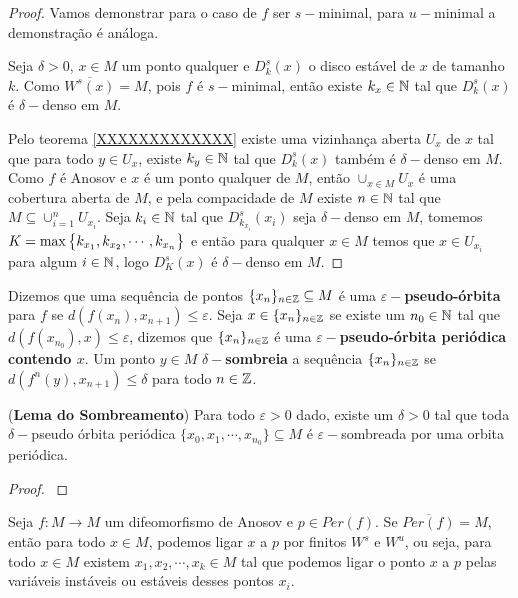 \begin{proof} Vamos demonstrar para o caso de $f$ ser $s-$minimal, para $u-$minimal a demonstração é análoga.

Seja $\delta>0$, $x\in M$ um ponto qualquer e $D_{k}^{s}(x)$ o disco estável de $x$ de tamanho $k$. Como $\overline{W^{s}(x)}=M$, pois $f$ é $s-$minimal, então existe $k_x\in\mathbb{N}$ tal que $D_{k}^{s}(x)$ é $\delta-$denso em $M$. 

Pelo teorema \ref{XXXXXXXXXXXXX} existe uma vizinhança aberta $U_x$ de $x$ tal que para todo $y\in U_x$, existe $k_y\in\mathbb{N}$ tal que $D_{k}^{s}(x)$ também é $\delta-$denso em $M$. Como $f$ é Anosov e $x$ é um ponto qualquer de $M$, então $\cup_{x\in M}{U_x}$ é uma cobertura aberta de $M$, e pela compacidade de $M$ existe $n\in \mathbb{N}$ tal que $M\subseteq \cup_{i=1}^{n}{U_{x_i}}$. Seja $k_i\in \mathbb{N}$ tal que $D_{k_{x_i}}^{s}(x_i)$ seja $\delta-$denso em $M$, tomemos $K=\max\big\{k_{x_1},k_{x_2},\cdots,k_{x_n}\big\}$ e então para qualquer $x\in M$ temos que $x\in U_{x_i}$ para algum $i\in\mathbb{N}$, logo $D_{K}^{s}(x)$ é $\delta-$denso em $M$.
\end{proof}

\begin{definicao} Dizemos que uma sequência de pontos $\{x_n\}_{n\in\mathbb{Z}}\subseteq M$ é uma \textbf{$\varepsilon-$pseudo-órbita} para $f$ se $d(f(x_n),x_{n+1})\leq\varepsilon$. Seja $x\in\{x_n\}_{n\in\mathbb{Z}}$ se existe um $n_0\in\mathbb{N}$ tal que $d(f(x_{n_0}),x)\leq\varepsilon$, dizemos que $\{x_n\}_{n\in\mathbb{Z}}$ é uma \textbf{$\varepsilon-$pseudo-órbita periódica contendo $x$}. Um ponto $y\in M$ \textbf{$\delta-$sombreia} a sequência $\{x_n\}_{n\in\mathbb{Z}}$ se $d(f^n(y),x_{n+1})\leq\delta$ para todo $n\in\mathbb{Z}$.

\end{definicao}

\begin{lema}\label{lemadosombrea} (\textbf{Lema do Sombreamento}) Para todo $\varepsilon>0$ dado, existe um $\delta>0$ tal que toda $\delta-$pseudo órbita periódica $\{x_0,x_1,\cdots,x_{n_0}\}\subseteq M$ é $\varepsilon-$sombreada por uma orbita periódica.
\end{lema}

\begin{proof} \cite{XXXXXXXXXXXXX}
\end{proof}

\begin{lema}\label{ligafinita} Seja $f:M\to M$ um difeomorfismo de Anosov e $p\in Per(f)$. Se $\overline{Per(f)}=M$, então para todo $x\in M$, podemos ligar $x$ a $p$ por finitos $W^s$ e $W^u$, ou seja, para todo $x\in M$ existem $x_1,x_2,\cdots,x_k\in M$ tal que podemos ligar o ponto $x$ a $p$ pelas variáveis instáveis ou estáveis desses pontos $x_i$.
\end{lema}

